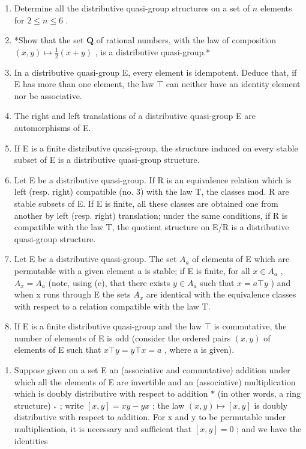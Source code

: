 \begin{enumerate}
\def\labelenumi{(\alph{enumi})}
\item
  Determine all the distributive quasi-group structures on a set of \(n\) elements for \(2 \leqslant n \leqslant 6\) .
\item
  *Show that the set \(\mathbf{Q}\) of rational numbers, with the law of composition \((x,y)\mapsto\frac{1}{2}(x+y)\) , is a distributive quasi-group.*
\item
  In a distributive quasi-group E, every element is idempotent. Deduce that, if E has more than one element, the law \(\top\) can neither have an identity element nor be associative.
\item
  The right and left translations of a distributive quasi-group E are automorphisms of E.
\item
  If E is a finite distributive quasi-group, the structure induced on every stable subset of E is a distributive quasi-group structure.
\item
  Let E be a distributive quasi-group. If R is an equivalence relation which is left (resp. right) compatible (no. 3) with the law T, the classes mod. R are stable subsets of E. If E is finite, all these classes are obtained one from another by left (resp. right) translation; under the same conditions, if R is compatible with the law T, the quotient structure on E/R is a distributive quasi-group structure.
\item
  Let E be a distributive quasi-group. The set \(A_{a}\) of elements of E which are permutable with a given element a is stable; if E is finite, for all \(x \in A_{a}\) , \(A_{x} = A_{a}\) (note, using (e), that there exists \(y \in A_{a}\) such that \(x = a \top y\) ) and when x runs through E the sets \(A_{x}\) are identical with the equivalence classes with respect to a relation compatible with the law T.
\item
  If E is a finite distributive quasi-group and the law \(\top\) is commutative, the number of elements of E is odd (consider the ordered pairs \((x,y)\) of elements of E such that \(x\top y=y\top x=a\) , where a is given).
\end{enumerate}

\begin{enumerate}
\def\labelenumi{\arabic{enumi}.}
\setcounter{enumi}{6}
\tightlist
\item
  Suppose given on a set E an (associative and commutative) addition under which all the elements of E are invertible and an (associative) multiplication which is doubly distributive with respect to addition \(*\) (in other words, a ring structure) \(_{*}\) ; write \([x,y]=xy-yx\) ; the law \((x,y)\mapsto[x,y]\) is doubly distributive with respect to addition. For x and y to be permutable under multiplication, it is necessary and sufficient that \([x,y]=0\) ; and we have the identities
\end{enumerate}

